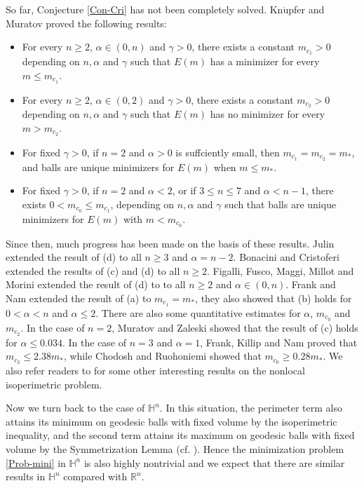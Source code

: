 \documentclass[11pt,reqno]{amsart}
\theoremstyle{definition}
\theoremstyle{remark}
\numberwithin{equation}{section}
\renewcommand{\(}{\left(}
\renewcommand{\)}{\right)}
\renewcommand{\-}{\overline}
\begin{document}
So far, Conjecture \ref{Con-Cri} has not been completely solved. Kn$\ddot{\mathrm{u}}$pfer and Muratov \cites{Knupfer-Muratov13,Knupfer-Muratov14} proved the following results:
\begin{itemize}
	\item[(a)] For every $n\geq 2$, $\alpha\in(0,n)$ and $\gamma>0$, there exists a constant $m_{c_1}>0$ depending on $n,\alpha$ and $\gamma$ such that $E(m)$ has a minimizer for every $m\leq m_{c_1}$.
	\item[(b)] For every $n\geq 2$, $\alpha\in(0,2)$ and $\gamma>0$, there exists a constant $m_{c_2}>0$ depending on $n,\alpha$ and $\gamma$ such that $E(m)$ has no minimizer for every $m>m_{c_2}$.
	\item[(c)] For fixed $\gamma>0$, if $n=2$ and $\alpha>0$ is suffciently small, then $m_{c_1}=m_{c_2}=m_{*}$, and balls are unique minimizers for $E(m)$ when $m\leq m_{*}$.
	\item[(d)] For fixed $\gamma>0$, if $n=2$ and $\alpha<2$, or if $3\leq n\leq 7$ and $\alpha<n-1$, there exists $0<m_{c_0}\leq m_{c_1}$, depending on $n,\alpha$ and $\gamma$ such that balls are unique minimizers for $E(m)$ with $m<m_{c_0}$.
\end{itemize}

Since then, much progress has been made on the basis of these results. Julin \cite{Julin14} extended the result of (d) to all $n\geq 3$ and $\alpha=n-2$. Bonacini and Cristoferi \cite{Bonacini-Cristoferi14} extended the results of (c) and (d) to all $n\geq 2$. Figalli, Fusco, Maggi, Millot and Morini \cite{Figalli15} extended the result of (d) to to all $n\geq 2$ and $\alpha\in(0,n)$. Frank and Nam \cite{Frank-Nam21} extended the result of (a) to $m_{c_1}=m_{*}$, they also showed that (b) holds for $0<\alpha<n$ and $\alpha\leq 2$. There are also some quantitative estimates for $\alpha$, $m_{c_0}$ and $m_{c_2}$. In the case of $n=2$, Muratov and Zaleski \cite{Muratov15} showed that the result of (c) holds for $\alpha\leq 0.034$.  In the case of $n=3$ and $\alpha=1$, Frank, Killip and Nam \cite{Frank-Killp-Nam16} proved that $m_{c_2}\leq 2.38m_{*}$, while Chodosh and Ruohoniemi \cite{Chodosh-Ruohomiemi25} showed that $m_{c_0}\geq 0.28m_{*}$. We also refer readers to \cites{Alama21,Carazzato23,Carazzato25,Choksi17,Choksi22,Frank19,Frank-Lieb15,Goldman15,Goldman25,Muratov18,Novaga21,Novaga22,Pascale25} for some other interesting results on the nonlocal isoperimetric problem.

Now we turn back to the case of $\mathbb{H}^n$. In this situation, the perimeter term also attains its minimum on geodesic balls with fixed volume by the isoperimetric inequality, and the second term attains its maximum on geodesic balls with fixed volume by the Symmetrization Lemma (cf. \cite[Page 225]{Beckner93}). Hence the minimization problem \eqref{Prob-mini} in $\mathbb{H}^n$ is also highly nontrivial and we expect that there are similar results in $\mathbb{H}^n$ compared with $\mathbb{R}^n$.
\end{document}
